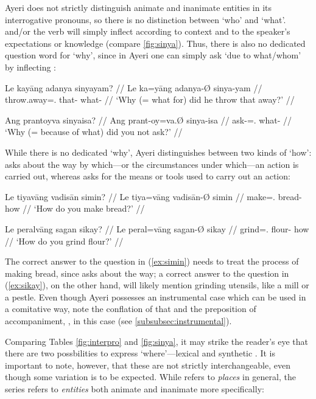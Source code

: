 Ayeri does not strictly distinguish animate and inanimate entities in its 
interrogative pronouns, so there is no distinction between `who' and `what'. 
 and/or the verb will simply inflect according to context and 
to the speaker's expectations or knowledge (compare \autoref{fig:sinya}). Thus, 
there is also no dedicated question word for `why', since in Ayeri one can 
simply ask `due to what/whom' by inflecting :

\pex
\a\begingl
	\gla Le kayāng adanya sinyayam? //
	\glb Le ka=yāng adanya-Ø sinya-yam //
	\glc \PatTI{} throw.away=\TsgM{}.\Aarg{} that-\Top{} what-\Dat{} //
	\glft `Why (= what for) did he throw that away?' //
\endgl

\a\begingl
	\gla Ang prantoyva sinyaisa? //
	\glb Ang prant-oy=va.Ø sinya-isa //
	\glc \AgtT{} ask-\Neg{}=\Ssg{}.\Top{} what-\Caus{} //
	\glft `Why (= because of what) did you not ask?' //
\endgl

\xe

While there is no dedicated `why', Ayeri distinguishes between two kinds of 
`how':  asks about the way by which---or the circumstances 
under which---an action is carried out, whereas  asks for the 
means or tools used to carry out an action:

\pex
\a\label{ex:simin}\begingl
	\gla Le tiyavāng vadisān simin? //
	\glb Le tiya=vāng vadisān-Ø simin //
	\glc \PatTI{} make=\Ssg{}.\Aarg{} bread-\Top{} how //
	\glft `How do you make bread?' //
\endgl

\a\label{ex:sikay}\begingl
	\gla Le peralvāng sagan sikay? //
	\glb Le peral=vāng sagan-Ø sikay //
	\glc \PatTI{} grind=\Ssg{}.\Aarg{} flour-\Top{} how //
	\glft `How do you grind flour?' //
\endgl

\xe

The correct answer to the question in (\ref{ex:simin}) needs to treat the 
process of making bread, since  asks about the way; a 
correct answer to the question in (\ref{ex:sikay}), on the other hand, will 
likely mention grinding utensils, like a mill or a pestle. Even though 
Ayeri possesses an instrumental case which can be used in a comitative way, 
note the conflation of that and the preposition of accompaniment, 
, in this case (see \autoref{subsubsec:instrumental}).

Comparing Tables \ref{fig:interpro} and \ref{fig:sinya}, it may strike the 
reader's eye that there are two possbilities to express 
`where'---lexical  and synthetic . It 
is important to note, however, that these are not strictly interchangeable, 
even though some variation is to be expected. While  refers 
to \emph{places} in general, the  series refers to 
\emph{entities} both animate and inanimate more specifically:

